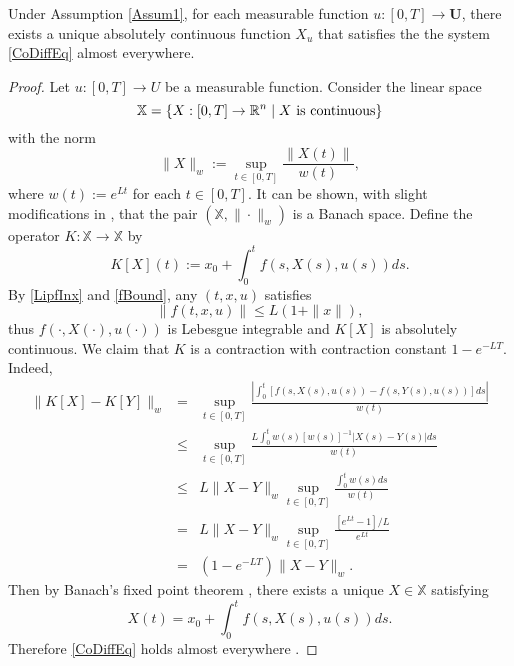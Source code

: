 
\begin{theorem}\label{ExAdmisPair} 
	Under Assumption \ref{Assum1}, for each measurable function 
	$u:[0,T]\to \mathbf{U}$, there exists a unique absolutely continuous function $X_u$ that satisfies the the system 
	\eqref{CoDiffEq} almost everywhere. %
\end{theorem}
\begin{proof} Let $u:[0,T]\to U$ be a measurable function. Consider the linear space 
    \[\mathbb{X}=\{X:[0,T]\to \mathbb{R}^n\mid X \mbox{ is continuous}\}\] 
with the norm
    \[ \|X\|_w:=\sup_{t\in[0,T]} \frac{\|X(t)\|}{w(t)}, \]
where $w(t):=e^{Lt}$ for each $t\in [0,T]$. It can be shown, with slight modifications in \cite[Section 2.1]{Teschl}, that the pair $(\mathbb{X},\|\cdot\|_w)$ is a Banach space. Define the operator $K:\mathbb{X}\to \mathbb{X}$ by 
    \[ K[X](t):=x_0 + \int_0^t f(s,X(s),u(s))ds.\]
By \eqref{LipfInx} and \eqref{fBound}, any $(t,x,u)$ satisfies 
  \begin{equation}
      \|f(t,x,u)\| \leq  L(1+\|x\|),
  \end{equation}
thus $f(\cdot,X(\cdot),u(\cdot))$ is Lebesgue integrable and $K[X]$ is absolutely continuous. We claim that $K$ is a contraction with contraction constant $1-e^{-LT}$. Indeed,
    \begin{eqnarray*}
    \| K[X] - K[Y] \|_w & = & \sup_{t\in[0,T]} \frac{|\int_0^t [f(s,X(s),u(s)) -f(s,Y(s),u(s))]ds|}{w(t)}\\
        & \leq &   \sup_{t\in[0,T]} \frac{L\int_0^t w(s)[w(s)]^{-1}|X(s) -Y(s)|ds}{w(t)}\\
        &\leq &  L\|X-Y\|_w \sup_{t\in[0,T]} \frac{\int_0^t w(s)ds}{w(t)}\\
        & = &  L\|X-Y\|_w \sup_{t\in[0,T]}\frac{[e^{Lt}-1]/L}{e^{Lt}}\\
        & = &  (1-e^{-LT})\|X-Y\|_w. 
    \end{eqnarray*}
Then by Banach's fixed point theorem \cite[Theorem 2.1]{Teschl}, there exists a unique $X\in \mathbb{X}$ satisfying 
    \[ X(t)=x_0 + \int_0^t f(s,X(s),u(s))ds.\]
Therefore \eqref{CoDiffEq} holds almost everywhere \cite[Corollary 5.4.1]{Loeb2016}.
\end{proof}


